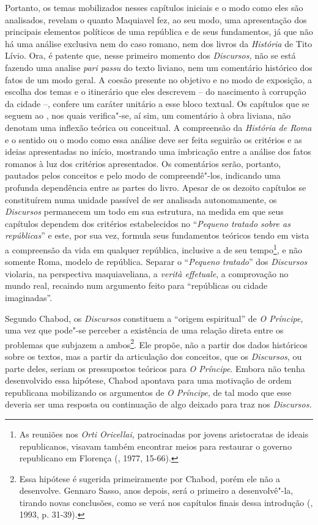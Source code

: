 Portanto, os temas mobilizados nesses capítulos iniciais e o modo como
eles são analisados, revelam o quanto Maquiavel fez, ao seu modo, uma
apresentação dos principais elementos políticos de uma república e de
seus fundamentos, já que não há uma análise exclusiva nem do caso
romano, nem dos livros da \emph{História} de Tito Lívio. Ora, é patente
que, nesse primeiro momento dos \emph{Discursos,} não se está fazendo
uma analise \emph{pari passu} do texto liviano, nem um comentário
histórico dos fatos de um modo geral. A coesão presente no objetivo e no
modo de exposição, a escolha dos temas e o itinerário que eles descrevem
-- do nascimento à corrupção da cidade --, confere um caráter unitário a
esse bloco textual. Os capítulos que se seguem ao , nos quais
verifica"-se, aí sim, um comentário à obra liviana, não denotam uma
inflexão teórica ou conceitual. A compreensão da \emph{História de Roma}
e o sentido ou o modo como essa análise deve ser feita seguirão os
critérios e as ideias apresentadas no início, mostrando uma imbricação
entre a análise dos fatos romanos à luz dos critérios apresentados. Os
comentários serão, portanto, pautados pelos conceitos e pelo modo de
compreendê"-los, indicando uma profunda dependência entre as partes do
livro. Apesar de os dezoito capítulos se constituírem numa unidade
passível de ser analisada autonomamente, os \emph{Discursos} permanecem
um todo em sua estrutura, na medida em que seus capítulos dependem dos
critérios estabelecidos no ``\emph{Pequeno tratado sobre as
repúblicas}'' e este, por sua vez, formula seus fundamentos teóricos
tendo em vista a compreensão da vida em qualquer república, inclusive a
de seu tempo\footnote{As reuniões nos \emph{Orti Oricellai,}
  patrocinadas por jovens aristocratas de ideais republicanos, visavam
  também encontrar meios para restaurar o governo republicano em
  Florença (, 1977, 15-66).}, e não somente Roma, modelo de
república. Separar o ``\emph{Pequeno tratado}'' dos \emph{Discursos}
violaria, na perspectiva maquiaveliana, a \emph{verità effetuale}, a
comprovação no mundo real, recaindo num argumento feito para
``repúblicas ou cidade imaginadas''.

Segundo Chabod, os \emph{Discursos} constituem a ``origem espiritual''
de \emph{O Príncipe,} uma vez que pode"-se perceber a existência
de uma relação direta entre os problemas que subjazem a ambos\footnote{Essa
  hipótese é sugerida primeiramente por Chabod, porém ele não a
  desenvolve. Gennaro Sasso, anos depois, será o primeiro a
  desenvolvê"-la, tirando novas conclusões, como se verá nos capítulos
  finais dessa introdução (, 1993, p. 31-39).}. Ele propõe, não a
partir dos dados históricos sobre os textos, mas a partir da articulação
dos conceitos, que os \emph{Discursos}, ou parte deles, seriam os
pressupostos teóricos para \emph{O Príncipe}. Embora não tenha
desenvolvido essa hipótese, Chabod apontava para uma motivação de ordem
republicana mobilizando os argumentos de \emph{O Príncipe}, de
tal modo que esse deveria ser uma resposta ou continuação de algo
deixado para traz nos \emph{Discursos.}

